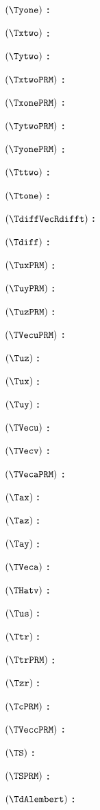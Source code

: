 $( \Tyone )$ \textbf{:} \Tyonedef

$( \Txtwo )$ \textbf{:} \Txtwodef

$( \Tytwo )$ \textbf{:} \Tytwodef

$( \TxtwoPRM )$ \textbf{:} \TxtwoPRMdef

$( \TxonePRM )$ \textbf{:} \TxonePRMdef

$( \TytwoPRM )$ \textbf{:} \TytwoPRMdef

$( \TyonePRM )$ \textbf{:} \TyonePRMdef

$( \Tttwo )$ \textbf{:} \Tttwodef

$( \Ttone )$ \textbf{:} \Ttonedef

$( \TdiffVecRdifft )$ \textbf{:} \TdiffVecRdifftdef

$( \Tdiff )$ \textbf{:} \Tdiffdef

$( \TuxPRM )$ \textbf{:} \TuxPRMdef

$( \TuyPRM )$ \textbf{:} \TuyPRMdef

$( \TuzPRM )$ \textbf{:} \TuzPRMdef

$( \TVecuPRM )$ \textbf{:} \TVecuPRMdef

$( \Tuz )$ \textbf{:} \Tuzdef

$( \Tux )$ \textbf{:} \Tuxdef

$( \Tuy )$ \textbf{:} \Tuydef

$( \TVecu )$ \textbf{:} \TVecudef

$( \TVecv )$ \textbf{:} \TVecvdef

$( \TVecaPRM )$ \textbf{:} \TVecaPRMdef

$( \Tax )$ \textbf{:} \Taxdef

$( \Taz )$ \textbf{:} \Tazdef

$( \Tay )$ \textbf{:} \Taydef

$( \TVeca )$ \textbf{:} \TVecadef

$( \THatv )$ \textbf{:} \THatvdef

$( \Tus )$ \textbf{:} \Tusdef

$( \Ttr )$ \textbf{:} \Ttrdef

$( \TtrPRM )$ \textbf{:} \TtrPRMdef

$( \Tzr )$ \textbf{:} \Tzrdef

$( \TcPRM )$ \textbf{:} \TcPRMdef

$( \TVeccPRM )$ \textbf{:} \TVeccPRMdef

$( \TS )$ \textbf{:} \TSdef

$( \TSPRM )$ \textbf{:} \TSPRMdef

$( \TdAlembert )$ \textbf{:} \TdAlembertdef


